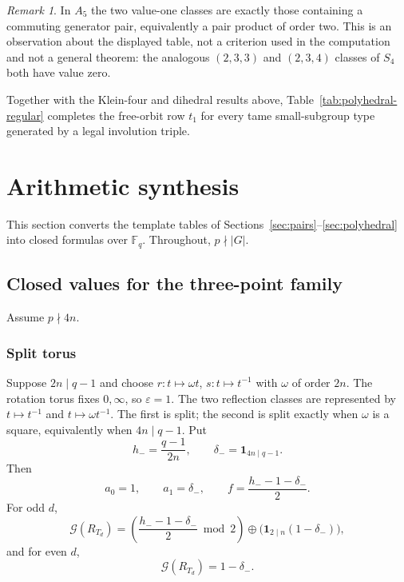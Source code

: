 \documentclass[11pt]{article}
\theoremstyle{definition}
\theoremstyle{remark}
\newtheorem{remark}[theorem]{Remark}
\newcommand{\F}{\mathbb{F}}
\newcommand{\Grundy}{\mathcal{G}}
\begin{document}
\begin{remark}
\label{rem:a5-commuting}
In $A_5$ the two value-one classes are exactly those containing a commuting generator pair,
equivalently a pair product of order two. This is an observation about the displayed table, not a
criterion used in the computation and not a general theorem: the analogous $(2,3,3)$ and $(2,3,4)$
classes of $S_4$ both have value zero.
\end{remark}

Together with the Klein-four and dihedral results above, Table~\ref{tab:polyhedral-regular}
completes the free-orbit row $t_1$ for every tame small-subgroup type generated by a legal
involution triple.

\section{Arithmetic synthesis}
\label{sec:arithmetic}

This section converts the template tables of Sections~\ref{sec:pairs}--\ref{sec:polyhedral} into
closed formulas over $\F_q$. Throughout, $p\nmid|G|$.

\subsection{Closed values for the three-point family}

Assume $p\nmid 4n$.

\subsubsection*{Split torus}

Suppose $2n\mid q-1$ and choose $r:t\mapsto\omega t$, $s:t\mapsto t^{-1}$ with $\omega$ of order
$2n$. The rotation torus fixes $0,\infty$, so $\varepsilon=1$. The two reflection classes are
represented by $t\mapsto t^{-1}$ and $t\mapsto\omega t^{-1}$. The first is split; the second is
split exactly when $\omega$ is a square, equivalently when $4n\mid q-1$. Put
\[
  h_-=\frac{q-1}{2n},\qquad \delta_-=\mathbf 1_{4n\mid q-1}.
\]
Then
\begin{equation}
  a_0=1,\qquad a_1=\delta_-,\qquad f=\frac{h_--1-\delta_-}{2}.
  \label{eq:split-orbits}
\end{equation}
For odd $d$,
\begin{equation}
  \Grundy(R_{T_d})
  =\left(\frac{h_--1-\delta_-}{2}\bmod 2\right)\oplus\bigl(\mathbf 1_{2\mid n}(1-\delta_-)\bigr),
  \label{eq:split-odd}
\end{equation}
and for even $d$,
\begin{equation}
  \Grundy(R_{T_d})=1-\delta_- .
  \label{eq:split-even}
\end{equation}
\end{document}
